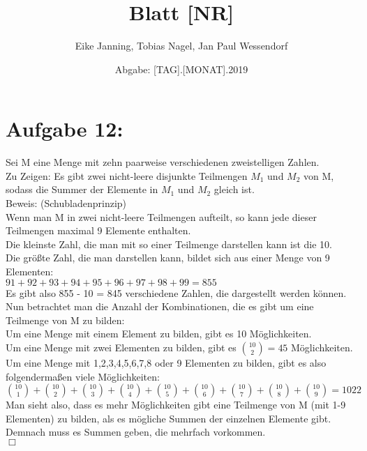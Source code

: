 \documentclass[paper = a4, ngerman]{scrartcl}
\title{Blatt [NR]}
\author{Eike Janning, Tobias Nagel, Jan Paul Wessendorf}
\date{Abgabe: [TAG].[MONAT].2019}
\begin{document}
\maketitle
\hrulefill
\section*{Aufgabe 12:}

Sei M eine Menge mit zehn paarweise verschiedenen zweistelligen Zahlen.\\

Zu Zeigen: Es gibt zwei nicht-leere disjunkte Teilmengen $M_1$ und $M_2$ von M, sodass die Summer der Elemente in $M_1$ und $M_2$ gleich ist.\\

Beweis: (Schubladenprinzip)\\

Wenn man M in zwei nicht-leere Teilmengen aufteilt, so kann jede dieser Teilmengen maximal 9 Elemente enthalten.\\

Die kleinste Zahl, die man mit so einer Teilmenge darstellen kann ist die 10.\\

Die größte Zahl, die man darstellen kann, bildet sich aus einer Menge von 9 Elementen:\\
$91+92+93+94+95+96+97+98+99 = 855$\\

Es gibt also 855 - 10 = 845 verschiedene Zahlen, die dargestellt werden können.\\

Nun betrachtet man die Anzahl der Kombinationen, die es gibt um eine Teilmenge von M zu bilden:\\

Um eine Menge mit einem Element zu bilden, gibt es 10 Möglichkeiten.\\
Um eine Menge mit  zwei Elementen zu bilden, gibt es $\binom{10}{2} = 45$ Möglichkeiten.\\

Um eine Menge mit 1,2,3,4,5,6,7,8 oder 9 Elementen zu bilden, gibt es also folgendermaßen viele Möglichkeiten:\\

$\binom{10}{1} + \binom{10}{2} +\binom{10}{3} +\binom{10}{4} + \binom{10}{5} +\binom{10}{6} +\binom{10}{7} + \binom{10}{8} +\binom{10}{9} = 1022$\\

Man sieht also, dass es mehr Möglichkeiten gibt eine Teilmenge von M (mit 1-9 Elementen) zu bilden, als es mögliche Summen der einzelnen Elemente gibt. Demnach muss es Summen geben, die mehrfach vorkommen.\\
\hfil$\Box$
\end{document}
